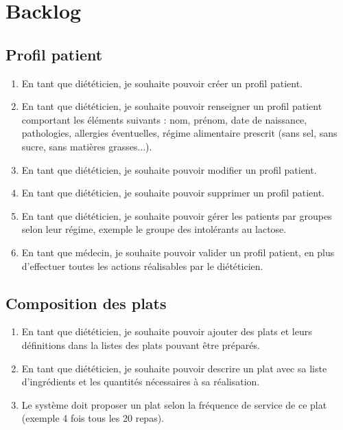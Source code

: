 \section{Backlog}
\subsection{Profil patient}
\begin{enumerate}
\item En tant que diététicien, je souhaite pouvoir créer un profil patient.
\item En tant que diététicien, je souhaite pouvoir renseigner un profil patient comportant les éléments suivants : nom, prénom, date de naissance, pathologies, allergies éventuelles, régime alimentaire prescrit (sans sel, sans sucre, sans matières grasses...).
\item En tant que diététicien, je souhaite pouvoir modifier un profil patient.
\item En tant que diététicien, je souhaite pouvoir supprimer un profil patient.
\item En tant que diététicien, je souhaite pouvoir gérer les patients par groupes selon leur régime, exemple le groupe des intolérants au lactose.
\item En tant que médecin, je souhaite pouvoir valider un profil patient, en plus d'effectuer toutes les actions réalisables par le diététicien.
\end{enumerate}

\subsection{Composition des plats}
\begin{enumerate}
\item En tant que diététicien, je souhaite pouvoir ajouter des plats et leurs définitions dans la listes des plats pouvant être préparés.
\item En tant que diététicien, je souhaite pouvoir descrire un plat avec sa liste d'ingrédients et les quantités nécessaires à sa réalisation.
\item Le système doit proposer un plat selon la fréquence de service de ce plat (exemple 4 fois tous les 20 repas).
  \end{enumerate}
